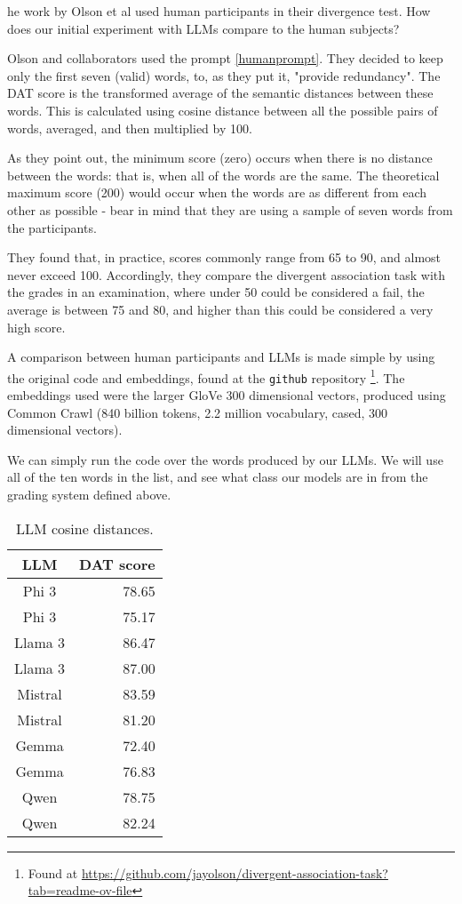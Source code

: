 \documentclass[9pt,a4paper,twoside]{rho-class/rho}
\begin{document}
he work by Olson et al \cite{Olson_2021} used human participants in their divergence test. How does our initial experiment with LLMs compare to the human subjects?

Olson and collaborators used the prompt \ref{humanprompt}. They decided to keep only the first seven (valid) words, to, as they put it, "provide redundancy". The DAT score is the transformed average of the semantic distances between these words. This is calculated using cosine distance between all the possible pairs of words, averaged, and then multiplied by 100. 

As they point out, the minimum score (zero) occurs when there is no distance between the words: that is, when all of the words are the same. The theoretical maximum score (200) would occur when the words are as different from each other as possible - bear in mind that they are using a sample of seven words from the participants.  

They found that, in practice, scores commonly range from 65 to 90, and almost never exceed 100. Accordingly, they compare the divergent association task with the grades in an examination, where under 50 could be considered a fail, the average is between 75 and 80, and higher than this could be considered a very high score.

A comparison between human participants and LLMs is made simple by using the original code and embeddings, found at the \texttt{github} repository \footnote{Found at \url{https://github.com/jayolson/divergent-association-task?tab=readme-ov-file}}. The embeddings used were the larger GloVe 300 dimensional vectors, produced using Common Crawl (840 billion tokens, 2.2 million vocabulary, cased, 300 dimensional vectors).  

We can simply run the code over the words produced by our LLMs. We will use all of the ten words in the list, and see what class our models are in from the grading system defined above.

\begin{table}
\caption{LLM cosine distances.}
\label{divergence_res2}
\begin{tabular}{cr}
\toprule
\textbf{LLM}  & \textbf{DAT score} \\ \hline 
Phi 3 & 78.65 \\
Phi 3 & 75.17 \\
Llama 3 & 86.47 \\
Llama 3 & 87.00 \\
Mistral & 83.59 \\
Mistral & 81.20 \\
Gemma & 72.40 \\
Gemma & 76.83 \\
Qwen & 78.75 \\
Qwen & 82.24 \\ \hline
\end{tabular}
\end{table}
\end{document}
